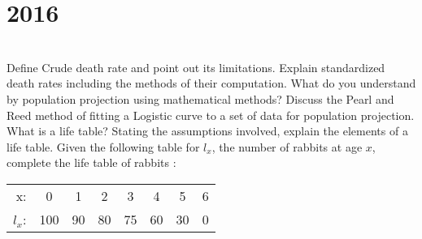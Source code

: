 \section*{2016}
\vspace{-.5cm}
\hrulefill \smallskip\\
 Define Crude death rate and point out its limitations. Explain standardized death rates including the methods of their computation.
\myline
{} What do you understand by population projection using mathematical methods? Discuss the Pearl and Reed method of fitting a Logistic curve to a set of data for population projection.
\myline
{} What is a life table? Stating the assumptions involved, explain the elements of a life table. Given the following table for $l_x$, the number of rabbits at age $x$, complete the life table of rabbits :
\begin{center}
    \begin{tabular}{r*{7}{c}}
        x: & 0 & 1 & 2 & 3 & 4 & 5 & 6 \\
        $l_x$: & 100 & 90 & 80 & 75 & 60 & 30 & 0
    \end{tabular}
\end{center}
